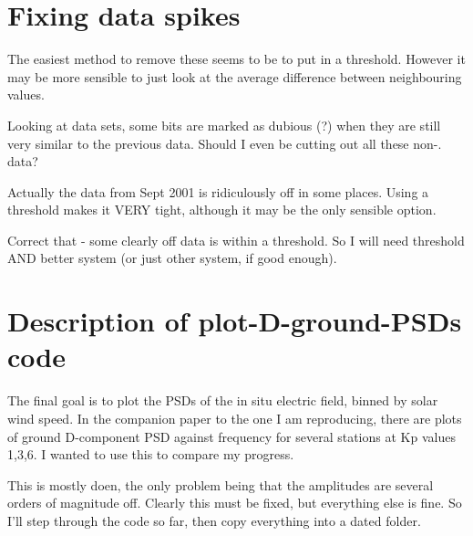 \documentclass[11pt]{article}
\begin{document}
\section{ Fixing data spikes}
The easiest method to remove these seems to be to put in a threshold. However it may be more
sensible to just look at the average difference between neighbouring values.

Looking at data sets, some bits are marked as dubious (?) when they are still very similar to
the previous data. Should I even be cutting out all these non-. data?

Actually the data from Sept 2001 is ridiculously off in some places. Using a threshold makes it
VERY tight, although it may be the only sensible option.

Correct that - some clearly off data is within a threshold. So I will need threshold AND better
system (or just other system, if good enough).


\section{Description of plot-D-ground-PSDs code}
The final goal is to plot the PSDs of the in situ electric field, binned by solar wind speed. In
the companion paper to the one I am reproducing, there are plots of ground D-component PSD
against frequency for several stations at Kp values 1,3,6. I wanted to use this to compare my
progress.

This is mostly doen, the only problem being that the amplitudes are several orders of magnitude
off. Clearly this must be fixed, but everything else is fine. So I'll step through the code so
far, then copy everything into a dated folder.
\end{document}
